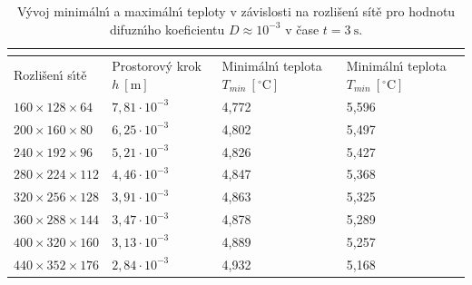             \begin{table}[H]
                \centering
                \begin{tabular}{p{}p{}p{}p{}}
                    \toprule
                    \multicolumn{4}{c}{\centering{$t=10.0 \ \mathrm{s}$}} \\ \midrule
                    Rozli\v{s}en\'{\i} s\'{\i}t\v{e} & \multicolumn{1}{p{2.5cm}}{Prostorov\'{y} krok $h \ [\mathrm{m}]$} & \multicolumn{1}{p{2.8cm}}{Minim\'{a}ln\'{\i} teplota $T_{min} \ [^\circ\mathrm{C}]$} & \multicolumn{1}{p{2.8cm}}{Minim\'{a}ln\'{\i} teplota $T_{min} \ [^\circ\mathrm{C}]$} \\ \midrule
                    $160 \times 128 \times 64$  & $7,81 \cdot  10^{-3}$ & 4,772 & 5,596 \\
                    $200 \times 160 \times 80$  & $6,25 \cdot  10^{-3}$ & 4,802 & 5,497 \\
                    $240 \times 192 \times 96$  & $5,21 \cdot  10^{-3}$ & 4,826 & 5,427 \\
                    $280 \times 224 \times 112$  & $4,46 \cdot  10^{-3}$ & 4,847 & 5,368 \\
                    $320 \times 256 \times 128$  & $3,91 \cdot  10^{-3}$ & 4,863 & 5,325 \\
                    $360 \times 288 \times 144$  & $3,47 \cdot  10^{-3}$ & 4,878 & 5,289 \\
                    $400 \times 320 \times 160$  & $3,13 \cdot  10^{-3}$ & 4,889 & 5,257 \\
                    $440 \times 352 \times 176$  & $2,84 \cdot  10^{-3}$ & 4,932 & 5,168 \\ \bottomrule
                \end{tabular}
                \caption{V\'{y}voj minim\'{a}ln\'{\i} a maxim\'{a}ln\'{\i} teploty v z\'{a}vislosti na rozli\v{s}en\'{\i} s\'{i}t\v{e} pro hodnotu difuzn\'{\i}ho koeficientu $D \approx 10^{-3}$ v \v{c}ase $t = 3 \ \mathrm{s}$.}
                \label{table:D10m3_10}
            \end{table}



